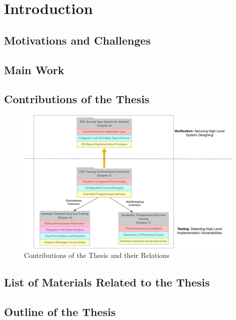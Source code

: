 
\chapter{Introduction} \label{ch:introduction}



\section{Motivations and Challenges}

\section{Main Work}

\section{Contributions of the Thesis}

\begin{figure}[ht]
	\begin{center}
		\includegraphics[width=0.98\textwidth]{res/contributions}
		\caption{Contributions of the Thesis and their Relations}
		\label{fig:works}
	\end{center}
\end{figure}


\section{List of Materials Related to the Thesis}

\section{Outline of the Thesis}

